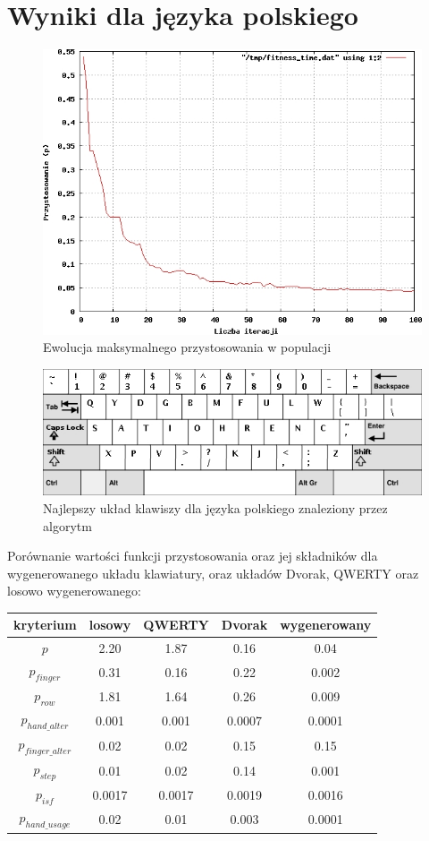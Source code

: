 \documentclass[brudnopis]{xmgr}
\begin{document}
\section{Wyniki dla języka polskiego}

\begin{figure}[!tbh]
\centering
\includegraphics[width=.8\hsize]{fig/fitness_time_pl}
\caption{Ewolucja maksymalnego przystosowania w populacji}
\end{figure}

\begin{figure}[!tbh]
\centering
\includegraphics[width=.8\hsize]{fig/best_en}
\caption{Najlepszy układ klawiszy dla języka polskiego znaleziony przez algorytm}
\end{figure}

Porównanie wartości funkcji przystosowania oraz jej składników dla wygenerowanego układu klawiatury, oraz układów Dvorak, QWERTY oraz losowo wygenerowanego:\newline
\begin{tabular}{ c | c | c | c | c}
  kryterium & losowy & QWERTY & Dvorak & wygenerowany \\
  \hline
  $p$			&   2.20 &   1.87 &   0.16 &   0.04 \\
  $p_{finger}$          &   0.31 &   0.16 &   0.22 &  0.002 \\
  $p_{row}$             &   1.81 &   1.64 &   0.26 &  0.009 \\
  $p_{hand\_alter}$     &  0.001 &  0.001 & 0.0007 & 0.0001 \\
  $p_{finger\_alter}$   &   0.02 &   0.02 &   0.15 &   0.15 \\
  $p_{step}$            &   0.01 &   0.02 &   0.14 &  0.001 \\
  $p_{isf}$             & 0.0017 & 0.0017 & 0.0019 & 0.0016 \\
  $p_{hand\_usage}$     &   0.02 &   0.01 &  0.003 & 0.0001 \\
\end{tabular}\newline\newline
\end{document}
